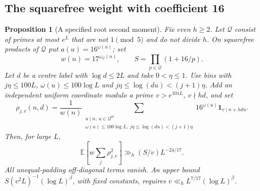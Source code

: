 \documentclass[11pt]{article}
\newtheorem{proposition}[theorem]{Proposition}
\theoremstyle{definition}
\newcommand{\E}{\mathbb E}
\newcommand{\ind}{\mathbf 1}
\theoremstyle{remark}
\numberwithin{equation}{section}
\newcommand{\sfw}{\mathrm{sf}}
\begin{document}
\subsection{The squarefree weight with coefficient 16}
\begin{proposition}[A specified root second moment]\label{prop:d-squarefree}
Fix even $h\ge2$. Let $\mathcal Q$ consist of primes at most $e^L$ that are not $1\pmod5$ and do not
divide $h$. On squarefree products of $\mathcal Q$ put $a(u)=16^{\omega(u)}$; set
\begin{equation}\label{eq:d-squarefree-data}
 w(n)=17^{\omega_{\mathcal Q}(n)},\qquad S=\prod_{p\in\mathcal Q}(1+16/p).
\end{equation}
Let $d$ be a centre label with $\log d\le2L$ and take $0<\eta\le1$.
Use bins with $j\eta\le100L$, $\omega(u)\le100\log L$ and
$j\eta\le\log(du)<(j+1)\eta$.
Add an independent uniform coordinate modulo a prime $v>e^{101L}$, $v\nmid hd$, and set
\begin{equation}\label{eq:d-squarefree-rho}
 \rho_{j,v}(n,d)=\frac1{w(n)}
 \sum_{\substack{u\mid n,\ u\in\mathcal Q^{\sfw}\\
 \omega(u)\le100\log L,\ j\eta\le\log(du)<(j+1)\eta}}
 16^{\omega(u)}\ind_{v\mid n+hdu}.
\end{equation}
Then, for large $L$,
\begin{equation}\label{eq:d-squarefree-moment}
 \E\left[w\sum_j\rho_{j,v}^2\right]\gg_h(S/v)L^{-24/17}.
\end{equation}
All unequal-padding off-diagonal terms vanish. An upper bound
$S(v^2L)^{-1}(\log L)^\beta$, with fixed constants, requires
$v\ll_h L^{7/17}(\log L)^\beta$.
\end{proposition}
\end{document}
